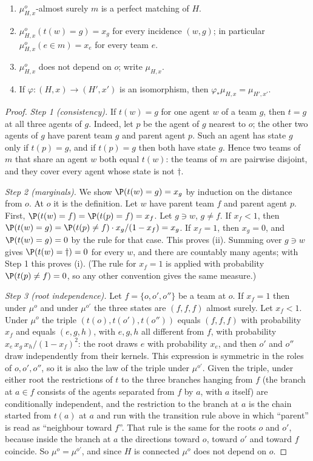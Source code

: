 \begin{lemma}\label{lem:tree-chain}
\begin{enumerate}
\item[(i)] $\mu^o_{H,x}$-almost surely $m$ is a perfect matching of $H$.
\item[(ii)] $\mu^o_{H,x}(t(w)=g)=x_g$ for every incidence $(w,g)$; in particular
$\mu^o_{H,x}(e\in m)=x_e$ for every team $e$.
\item[(iii)] $\mu^o_{H,x}$ does not depend on $o$; write $\mu_{H,x}$.
\item[(iv)] If $\varphi:(H,x)\to(H',x')$ is an isomorphism, then
$\varphi_*\mu_{H,x}=\mu_{H',x'}$.
\end{enumerate}
\end{lemma}

\begin{proof}
\emph{Step 1 (consistency).} If $t(w)=g$ for one agent $w$ of a team $g$, then $t=g$ at all
three agents of $g$. Indeed, let $p$ be the agent of $g$ nearest to $o$; the other two agents
of $g$ have parent team $g$ and parent agent $p$. Such an agent has state $g$ only if
$t(p)=g$, and if $t(p)=g$ then both have state $g$. Hence two teams of $m$ that share an agent
$w$ both equal $t(w)$: the teams of $m$ are pairwise disjoint, and they cover every agent whose
state is not $\dagger$.

\emph{Step 2 (marginals).} We show $\P(t(w)=g)=x_g$ by induction on the distance from $o$. At
$o$ it is the definition. Let $w$ have parent team $f$ and parent agent $p$. First,
$\P(t(w)=f)=\P(t(p)=f)=x_f$. Let $g\ni w$, $g\ne f$. If $x_f<1$, then
$\P(t(w)=g)=\P(t(p)\ne f)\cdot x_g/(1-x_f)=x_g$. If $x_f=1$, then $x_g=0$, and $\P(t(w)=g)=0$
by the rule for that case. This proves (ii). Summing over $g\ni w$ gives
$\P(t(w)=\dagger)=0$ for every $w$, and there are countably many agents; with Step 1 this
proves (i). (The rule for $x_f=1$ is applied with probability $\P(t(p)\ne f)=0$, so any other
convention gives the same measure.)

\emph{Step 3 (root independence).} Let $f=\{o,o',o''\}$ be a team at $o$. If $x_f=1$ then under
$\mu^o$ and under $\mu^{o'}$ the three states are $(f,f,f)$ almost surely. Let $x_f<1$. Under
$\mu^o$ the triple $(t(o),t(o'),t(o''))$ equals $(f,f,f)$ with probability $x_f$ and equals
$(e,g,h)$, with $e,g,h$ all different from $f$, with probability $x_e\,x_g\,x_h/(1-x_f)^2$: the
root draws $e$ with probability $x_e$, and then $o'$ and $o''$ draw independently from their
kernels. This expression is symmetric in the roles of $o,o',o''$, so it is also the law of the
triple under $\mu^{o'}$. Given the triple, under either root the restrictions of $t$ to the
three branches hanging from $f$ (the branch at $a\in f$ consists of the agents separated from
$f$ by $a$, with $a$ itself) are conditionally independent, and the restriction to the branch
at $a$ is the chain started from $t(a)$ at $a$ and run with the transition rule above in which
``parent'' is read as ``neighbour toward $f$''. That rule is the same for the roots $o$ and
$o'$, because inside the branch at $a$ the directions toward $o$, toward $o'$ and toward $f$
coincide. So $\mu^o=\mu^{o'}$, and since $H$ is connected $\mu^o$ does not depend on $o$.


\end{proof}
